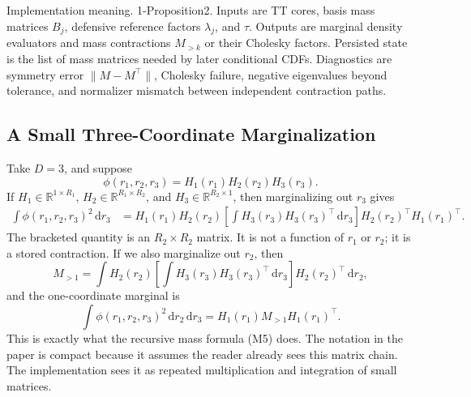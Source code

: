 \documentclass[11pt]{article}
\numberwithin{equation}{section}
\newcommand{\R}{\mathbb R}
\newcommand{\dd}{\,\mathrm d}
\begin{document}
Implementation meaning. 1-Proposition2.  Inputs are TT cores, basis mass
matrices \(B_j\), defensive reference factors \(\lambda_j\), and \(\tau\).
Outputs are marginal density evaluators and mass contractions \(M_{>k}\) or
their Cholesky factors.  Persisted state is the list of mass matrices needed by
later conditional CDFs.  Diagnostics are symmetry error
\(\|M-M^\top\|\), Cholesky failure, negative eigenvalues beyond tolerance, and
normalizer mismatch between independent contraction paths.

\begin{center}
\end{center}

\subsection{A Small Three-Coordinate Marginalization}

Take \(D=3\), and suppose
\[
    \phi(r_1,r_2,r_3)=H_1(r_1)H_2(r_2)H_3(r_3).
\]
If \(H_1\in\R^{1\times R_1}\),
\(H_2\in\R^{R_1\times R_2}\), and
\(H_3\in\R^{R_2\times 1}\), then marginalizing out \(r_3\) gives
\begin{equation}
\begin{aligned}
 \int \phi(r_1,r_2,r_3)^2\dd r_3
 &=
 H_1(r_1)H_2(r_2)
 \left[\int H_3(r_3)H_3(r_3)^\top\dd r_3\right]
 H_2(r_2)^\top H_1(r_1)^\top.
\end{aligned}
\label{eq:p24-m7}
\end{equation}
The bracketed quantity is an \(R_2\times R_2\) matrix.  It is not a function of
\(r_1\) or \(r_2\); it is a stored contraction.  If we also marginalize out
\(r_2\), then
\begin{equation}
    M_{>1}
    =
    \int
    H_2(r_2)
    \left[\int H_3(r_3)H_3(r_3)^\top\dd r_3\right]
    H_2(r_2)^\top
    \dd r_2,
    \label{eq:p24-m8}
\end{equation}
and the one-coordinate marginal is
\begin{equation}
    \int\phi(r_1,r_2,r_3)^2\dd r_2\dd r_3
    =
    H_1(r_1)M_{>1}H_1(r_1)^\top.
    \label{eq:p24-m9}
\end{equation}
This is exactly what the recursive mass formula (M5) does.  The notation in the
paper is compact because it assumes the reader already sees this matrix chain.
The implementation sees it as repeated multiplication and integration of small
matrices.
\end{document}
